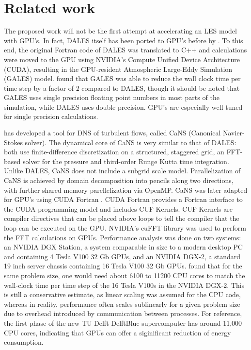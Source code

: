 \section{Related work}



The proposed work will not be the first attempt at accelerating an LES model with GPU's. In fact, DALES itself has been ported to GPU's before by \citet{schalkwijkHighPerformanceSimulationsTurbulent2012}. To this end, the original Fortran code of DALES was translated to C++ and calculations were moved to the GPU using NVIDIA's Compute Unified Device Architecture (CUDA), resulting in the GPU-resident Atmospheric Large-Eddy Simulation (GALES) model. \citet{schalkwijkHighPerformanceSimulationsTurbulent2012} found that GALES was able to reduce the wall clock time per time step by a factor of 2 compared to DALES, though it should be noted that GALES uses single precision floating point numbers in most parts of the simulation, while DALES uses double precision. GPU's are especially well tuned for single precision calculations. 

\citet{costaFFTbasedFinitedifferenceSolver2018} has developed a tool for DNS of turbulent flows, called CaNS (Canonical Navier-Stokes solver). The dynamical core of CaNS is very similar to that of DALES: both use finite-difference discretization on a structured, staggered grid, an FFT-based solver for the pressure and third-order Runge Kutta time integration. Unlike DALES, CaNS does not include a subgrid scale model. Parallelization of CaNS is achieved by domain decomposition into pencils along two directions, with further shared-memory parellelization via OpenMP.
CaNS was later adapted for GPU's using CUDA Fortran \citep{costaGPUAccelerationCaNS2021}. CUDA Fortran provides a Fortran interface to the CUDA programming model and includes CUF Kernels. CUF Kernels are compiler directives that can be placed above loops to tell the compiler that the loop can be executed on the GPU. NVIDIA's cuFFT library was used to perform the FFT calculations on GPUs. Performance analysis was done on two systems: an NVIDIA DGX Station, a system comparable in size to a modern desktop PC and containing 4 Tesla V100 32 Gb GPUs, and an NVIDIA DGX-2, a standard 19 inch server chassis containing 16 Tesla V100 32 Gb GPUs. \citet{costaGPUAccelerationCaNS2021} found that for the same problem size, one would need about 6100 to 11200 CPU cores to match the wall-clock time per time step of the 16 Tesla V100s in the NVIDIA DGX-2. This is still a conservative estimate, as linear scaling was assumed for the CPU code, whereas in reality, performance often scales sublinearly for a given problem size due to overhead introduced by communication between processes. For reference, the first phase of the new TU Delft DelftBlue supercomputer has around 11,000 CPU cores, indicating that GPUs can offer a siginificant reduction of energy consumption.

